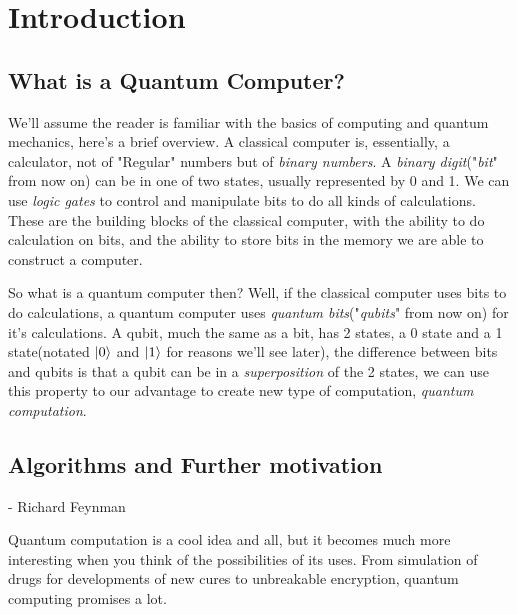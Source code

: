 \documentclass[english, a4paper, 12pt, twoside]{article}
\numberwithin{equation}{section} %
\begin{document}
\section{Introduction}
\subsection{What is a Quantum Computer?}
We'll assume the reader is familiar with the basics of computing and quantum mechanics, here's a brief overview. \newline
 A classical computer is, essentially, a calculator, not of "Regular" numbers but of \textit{binary numbers}. %
 A \textit{binary digit}("\textit{bit}" from now on) can be in one of two states, usually represented by 0 and 1. We can use \textit{logic gates} to control and manipulate bits to do all kinds of calculations. These are the building blocks of the classical computer, with the ability to do calculation on bits, and the ability to store bits in the memory we are able to construct a computer.
 
So what is a quantum computer then? Well, if the classical computer uses bits to do calculations, a quantum computer uses \textit{quantum bits}("\textit{qubits}" from now on) for it's calculations. A qubit, much the same as a bit, has 2 states, a 0 state and a 1 state(notated $\ket{0}$ and $\ket{1}$ for reasons we'll see later), the difference between bits and qubits is that a qubit can be in a \textit{superposition} of the 2 states, we can use this property to our advantage to create new type of computation, \textit{quantum computation}.

\subsection{Algorithms and Further motivation}
 \begin{quotation}
 \end{quotation}
\centerline{- Richard Feynman}
Quantum computation is a cool idea and all, but it becomes much more interesting when you think of the possibilities of its uses. From simulation of drugs for developments of new cures to unbreakable encryption, quantum computing promises a lot. 
\end{document}
